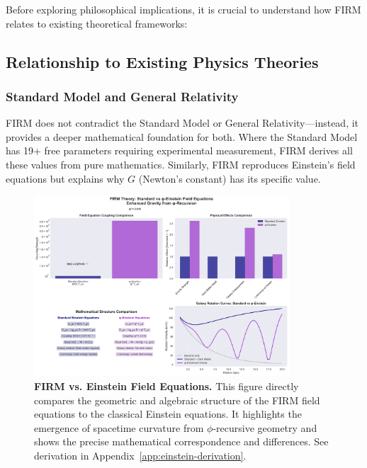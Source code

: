 \documentclass[12pt]{article}
\begin{document}
Before exploring philosophical implications, it is crucial to understand how FIRM relates to existing theoretical frameworks:

\subsection{Relationship to Existing Physics Theories}

\subsubsection{Standard Model and General Relativity}
FIRM does not contradict the Standard Model or General Relativity—instead, it provides a deeper mathematical foundation for both. Where the Standard Model has 19+ free parameters requiring experimental measurement, FIRM derives all these values from pure mathematics. Similarly, FIRM reproduces Einstein's field equations but explains why $G$ (Newton's constant) has its specific value.

\begin{figure}[ht]
    \centering
    \includegraphics[width=0.85\textwidth]{figures/einstein_equations_comparison.png}
    \caption{
        \textbf{FIRM vs. Einstein Field Equations.}
        This figure directly compares the geometric and algebraic structure of the FIRM field equations to the classical Einstein equations. It highlights the emergence of spacetime curvature from $\phi$-recursive geometry and shows the precise mathematical correspondence and differences.
        See derivation in Appendix~\ref{app:einstein-derivation}.
    }
    \label{fig:einstein_equations_comparison}
\end{figure}
\end{document}
